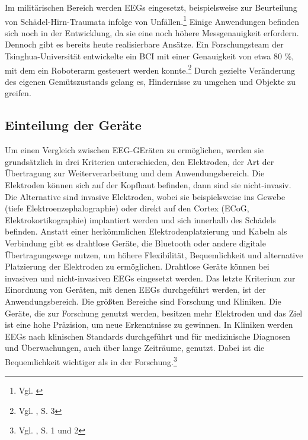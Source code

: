 Im militärischen Bereich werden EEGs eingesetzt, beispielsweise zur Beurteilung von Schädel-Hirn-Traumata infolge von Unfällen.\footnote{Vgl. \cite{fanter1986}} \newline
 Einige Anwendungen befinden sich noch in der Entwicklung, da sie eine noch höhere Messgenauigkeit erfordern. Dennoch gibt es bereits heute realisierbare Ansätze. Ein Forschungsteam der Tsinghua-Universität entwickelte ein BCI mit einer Genauigkeit von etwa 80 \%, mit dem ein Roboterarm gesteuert werden konnte.\footnote{Vgl. \cite{qin2023}, S. 3} Durch gezielte Veränderung des eigenen Gemütszustands gelang es, Hindernisse zu umgehen und Objekte zu greifen.

\subsection{Einteilung der Geräte}
Um einen Vergleich zwischen EEG-GEräten zu ermöglichen, werden sie grundsätzlich in drei Kriterien unterschieden, den Elektroden, der Art der Übertragung zur Weiterverarbeitung und dem Anwendungsbereich. \newline
Die Elektroden können sich auf der Kopfhaut befinden, dann sind sie nicht-invasiv. Die Alternative sind invasive Elektroden, wobei sie beispielsweise ins Gewebe (tiefe Elektroenzephalographie) oder direkt auf den Cortex (ECoG, Elektrokortikographie) implantiert werden und sich innerhalb des Schädels befinden. \newline
Anstatt einer herkömmlichen Elektrodenplatzierung und Kabeln als Verbindung gibt es drahtlose Geräte, die Bluetooth oder andere digitale Übertragungswege nutzen, um höhere Flexibilität, Bequemlichkeit und alternative Platzierung der Elektroden zu ermöglichen. Drahtlose Geräte können bei invasiven und nicht-invasiven EEGs eingesetzt werden. \newline
Das letzte Kriterium zur Einordnung von Geräten, mit denen EEGs durchgeführt werden, ist der Anwendungsbereich. Die größten Bereiche sind Forschung und Kliniken. Die Geräte, die zur Forschung genutzt werden, besitzen mehr Elektroden und das Ziel ist eine hohe Präzision, um neue Erkenntnisse zu gewinnen. In Kliniken werden EEGs nach klinischen Standards durchgeführt und für medizinische Diagnosen und Überwachungen, auch über lange Zeiträume, genutzt. Dabei ist die Bequemlichkeit wichtiger als in der Forschung.\footnote{Vgl. \cite{qin2023}, S. 1 und 2}


